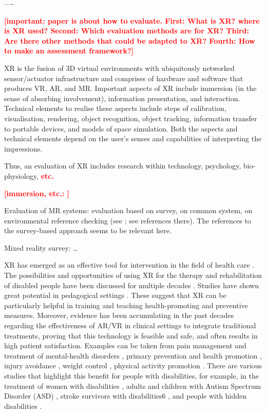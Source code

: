 \documentclass[11pt,english]{nik}
\newcommand{\WVL}[1]{\textbf{\textcolor{red}{#1}}}
\begin{document}
----

\WVL{[important: paper is about how to evaluate. First: What is XR? where is XR used? Second: Which evaluation methods are for XR? Third: Are there other methods that could be adapted to XR? Fourth: How to make an assessment framework?]}

XR
is the fusion of 3D virtual environments with ubiquitously networked sensor/actuator infrastructure \autocite{paradiso2009guest} and comprises of hardware and software that produces VR, AR, and MR.
Important aspects of XR include immersion (in the sense of absorbing involvement), information presentation, and interaction. 
Technical elements to realise these aspects include steps of calibration, visualisation, rendering, object recognition, object tracking, information transfer to portable devices, and models of space simulation.
Both the aspects and technical elements depend on the user's senses and capabilities of interpreting the impressions. 

Thus, an evaluation of XR includes research within technology, psychology, bio-physiology, \WVL{etc.}

\WVL{[immersion, etc.:  \autocite{Tjostheim1430618} ]}

Evaluation of MR systems: evaluation based on survey, on common system, on environmental reference checking (see \citet[p.13][]{rokhsaritalemiReviewMixedReality2020}; see  references there). The references to the survey-based approach seems to be relevant here. 

Mixed reality survey: \autocite{Costanza2009} \dots

XR has emerged as an effective tool for intervention in the field of health care  \autocite{mesa-gresa-effectiveness-2018}. 
The possibilities and opportunities of using XR for the therapy and rehabilitation
of disabled people have been discussed for multiple decades \autocite{kuhlen1995virtual,wilson1997virtual}.
Studies have shown great potential in pedagogical settings \autocite{akcayir2017advantages,bacca2014augmented,koutromanos2015the}. 
These suggest that XR can be particularly helpful in training and teaching health-promoting and preventive measures. Moreover, evidence has been
accumulating in the past decades regarding the effectiveness of AR/VR in clinical settings to integrate traditional
treatments, proving that this technology is feasible and safe, and often results in high patient satisfaction. Examples
can be taken from pain management and treatment of mental-health disorders \autocite{white2018a,dascal2017virtual}, 
primary prevention and health promotion \autocite{jerdan2018head,litleskare2020enable},
injury avoidance \autocite{omaki2017systematic}, weight control \autocite{fox2009virtual}, 
physical activity promotion \autocite{calogiuri-litleskare-macintyre-virtualexperiences-2019}.
There are various studies that highlight this benefit for people with disabilities, for example, in the treatment of women
with disabilities \autocite{nosek2016an}, adults
and children with Autism Spectrum Disorder (ASD) \autocite{newbutt2017the,cai2013design}, 
stroke survivors with disabilities6 \autocite{badia2016virtual}, 
and people with hidden disabilities \autocite{poyade2017using,poyade2019isensevr}. 
\end{document}
